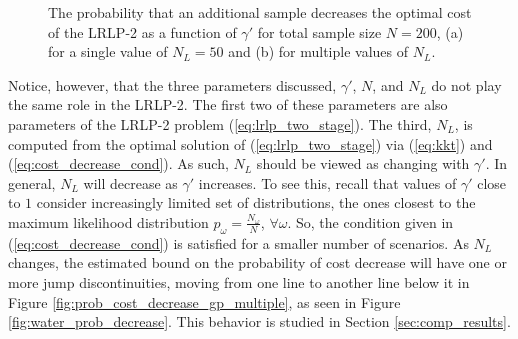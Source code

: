 \documentclass{iserc}
\begin{document}
\begin{figure}
	\centering
	\caption{The probability that an additional sample decreases the optimal cost of the LRLP-2 as a function of $\gamma'$ for total sample size $N = 200$, (a) for a single value of $N_L = 50$ and (b) for multiple values of $N_L$.}
\end{figure}

Notice, however, that the three parameters discussed, $\gamma'$, $N$, and $N_L$ do not play the same role in the LRLP-2.
The first two of these parameters are also parameters of the LRLP-2 problem (\ref{eq:lrlp_two_stage}).
The third, $N_L$, is computed from the optimal solution of (\ref{eq:lrlp_two_stage}) via (\ref{eq:kkt}) and (\ref{eq:cost_decrease_cond}).
As such, $N_L$ should be viewed as changing with $\gamma'$.
In general, $N_L$ will decrease as $\gamma'$ increases. To see this, recall that values of  $\gamma'$ close to $1$ consider increasingly limited set of distributions, the ones closest to the maximum likelihood distribution $p_\omega = \frac{N_\omega}{N}$, $\forall \omega$. So, the condition given in (\ref{eq:cost_decrease_cond}) is satisfied for a smaller number of scenarios. As $N_L$ changes, the estimated bound on the probability of cost decrease will have one or more jump discontinuities, moving from one line to another line below it in Figure \ref{fig:prob_cost_decrease_gp_multiple}, as seen in Figure \ref{fig:water_prob_decrease}.
This behavior is studied in Section \ref{sec:comp_results}.
\end{document}
